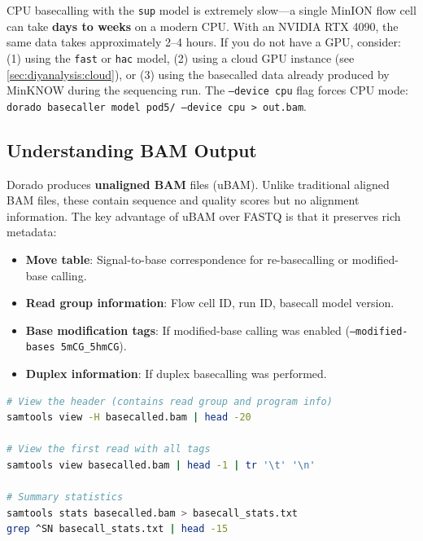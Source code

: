 \begin{warningbox}[title={GPU vs CPU Basecalling}]
CPU basecalling with the \texttt{sup} model is extremely slow---a single MinION flow cell can take \textbf{days to weeks} on a modern CPU. With an NVIDIA RTX 4090, the same data takes approximately 2--4 hours. If you do not have a GPU, consider: (1) using the \texttt{fast} or \texttt{hac} model, (2) using a cloud GPU instance (see \cref{sec:diyanalysis:cloud}), or (3) using the basecalled data already produced by MinKNOW during the sequencing run. The \texttt{--device cpu} flag forces CPU mode: \texttt{dorado basecaller model pod5/ --device cpu > out.bam}.
\end{warningbox}

\subsection{Understanding BAM Output}
\label{subsec:diyanalysis:bam_output}

Dorado produces \textbf{unaligned BAM} files (uBAM). Unlike traditional aligned BAM files, these contain sequence and quality scores but no alignment information. The key advantage of uBAM over \acrshort{FASTQ} is that it preserves rich metadata:

\begin{itemize}[nosep]
  \item \textbf{Move table}: Signal-to-base correspondence for re-basecalling or modified-base calling.
  \item \textbf{Read group information}: Flow cell ID, run ID, basecall model version.
  \item \textbf{Base modification tags}: If modified-base calling was enabled (\texttt{--modified-bases 5mCG\_5hmCG}).
  \item \textbf{Duplex information}: If duplex basecalling was performed.
\end{itemize}

\begin{lstlisting}[language=bash,caption={Inspecting uBAM metadata.},label=lst:diy-bam-inspect]
# View the header (contains read group and program info)
samtools view -H basecalled.bam | head -20

# View the first read with all tags
samtools view basecalled.bam | head -1 | tr '\t' '\n'

# Summary statistics
samtools stats basecalled.bam > basecall_stats.txt
grep ^SN basecall_stats.txt | head -15
\end{lstlisting}

